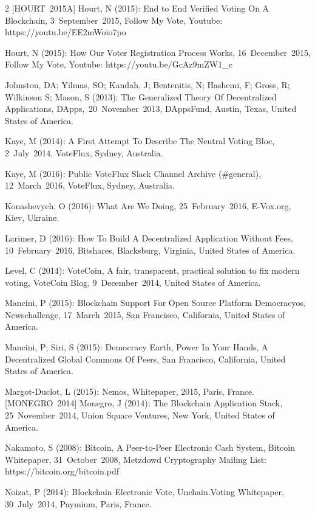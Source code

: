 \documentclass[9pt,oneside]{amsart}
\begin{document}
\begin{multicols}{2}
[HOURT~2015A] Hourt, N (2015): End to End Verified Voting On A Blockchain, 3~September~2015, Follow My Vote, Youtube: https://youtu.be/EE2mWoio7po\par
[HOURT~2015B] Hourt, N (2015): How Our Voter Registration Process Works, 16~December~2015, Follow My Vote, Youtube: https://youtu.be/GcAz9mZW1\_c\par
[JOHNSTON~et~al.~2013] Johnston, DA; Yilmas, SO; Kandah, J; Bentenitis, N; Hashemi, F; Gross, R; Wilkinson S; Mason, S (2013): The Generalized Theory Of Decentralized Applications, DApps,~20~November~2013, DAppsFund, Austin, Texas, United States of America.\par
[KAYE~2014] Kaye, M (2014): A First Attempt To Describe The Neutral Voting Bloc, 2~July~2014, VoteFlux, Sydney, Australia.\par
[KAYE~2016] Kaye, M (2016): Public VoteFlux Slack Channel Archive (\#general), 12~March~2016, VoteFlux, Sydney, Australia.\par
[KONASHEVYCH~2016] Konashevych, O (2016): What Are We Doing, 25~February~2016, E-Vox.org, Kiev, Ukraine.\par
[LARIMER~2016] Larimer, D (2016): How To Build A Decentralized Application Without Fees, 10~February~2016, Bitshares, Blacksburg, Virginia, United States of America.\par
[LEVEL~2014] Level, C (2014): VoteCoin, A fair, transparent, practical solution to fix modern voting, VoteCoin Blog, 9~December~2014, United States of America.\par
[MANCINI~2015] Mancini, P (2015): Blockchain Support For Open Source Platform Democracyos, Newschallenge, 17~March~2015, San Francisco, California, United States of America.\par
[MANCINI~et~al.~2015] Mancini, P; Siri, S (2015): Democracy Earth, Power In Your Hands, A Decentralized Global Commons Of Peers, San Francisco, California, United States of America.\par
[MARGOT-DUCLOT~2015] Margot-Duclot, L (2015): Nemos, Whitepaper, 2015, Paris, France.
[MONEGRO~2014] Monegro, J (2014): The Blockchain Application Stack, 25~November~2014, Union Square Ventures, New York, United States of America.\par
[NAKAMOTO~2008] Nakamoto, S (2008): Bitcoin, A Peer-to-Peer Electronic Cash System, Bitcoin Whitepaper, 31~October~2008, Metzdowd Cryptography Mailing List: https://bitcoin.org/bitcoin.pdf\par
[NOIZAT~2014] Noizat, P (2014): Blockchain Electronic Vote, Unchain.Voting Whitepaper, 30~July~2014, Paymium, Paris, France.\par

\end{multicols}
\end{document}
